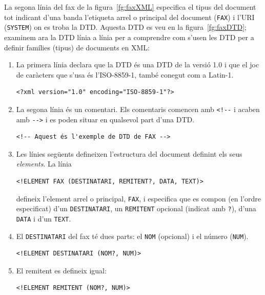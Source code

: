 La segona línia del fax de la figura~\ref{fg:faxXML} especifica el
tipus del document tot indicant d'una banda l'etiqueta arrel o
principal del document (\texttt{FAX}) i l'URI (\texttt{SYSTEM}) on es
troba la DTD. Aquesta DTD es veu en la figura~\ref{fg:faxDTD};
examinem ara la DTD línia a línia per a comprendre com s'usen les DTD per
a definir famílies (tipus) de documents en XML:
\begin{enumerate}
\item La primera línia declara que la DTD és una DTD de la versió
1.0 i que el joc de caràcters que s'usa és l'ISO-8859-1, també
conegut com a Latin-1.
\begin{small}\begin{verbatim}
<?xml version="1.0" encoding="ISO-8859-1"?>
\end{verbatim}\end{small}
\item La segona línia és un comentari. Els comentaris comencen amb
  \verb+<!--+ i acaben amb \verb+-->+ i es poden situar en qualsevol
  part d'una DTD.
\begin{small}\begin{verbatim}
<!-- Aquest és l'exemple de DTD de FAX -->
\end{verbatim}\end{small}
\item Les línies següents defineixen l'estructura del document
  definint els seus \emph{elements}. La línia
\begin{small}\begin{verbatim}
<!ELEMENT FAX (DESTINATARI, REMITENT?, DATA, TEXT)>
\end{verbatim}\end{small}
defineix l'element arrel o principal, \texttt{FAX}, i especifica que
es compon (en l'ordre especificat) d'un \texttt{DESTINATARI}, un
\texttt{REMITENT} opcional (indicat amb \texttt{?}), d'una \texttt{DATA} i d'un
\texttt{TEXT}. 
\item El \texttt{DESTINATARI} del fax té dues parts: el \texttt{NOM}
  (opcional) i el número (\texttt{NUM}).
\begin{small}\begin{verbatim}
<!ELEMENT DESTINATARI (NOM?, NUM)>
\end{verbatim}\end{small}
\item El remitent es defineix igual:
\begin{small}\begin{verbatim}
<!ELEMENT REMITENT (NOM?, NUM)>

\end{verbatim}
\end{small}
\end{enumerate}
